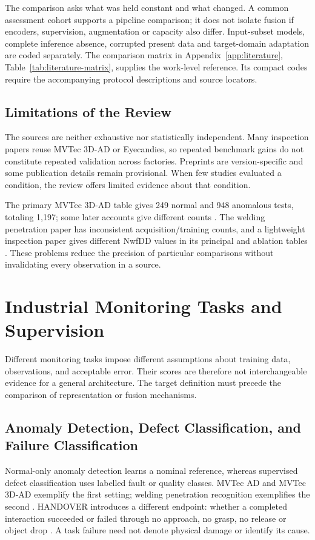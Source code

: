 The comparison asks what was held constant and what changed. A common assessment cohort supports a pipeline comparison; it does not isolate fusion if encoders, supervision, augmentation or capacity also differ. Input-subset models, complete inference absence, corrupted present data and target-domain adaptation are coded separately. The comparison matrix in Appendix~\ref{app:literature}, Table~\ref{tab:literature-matrix}, supplies the work-level reference. Its compact codes require the accompanying protocol descriptions and source locators.

\subsection{Limitations of the Review}
The sources are neither exhaustive nor statistically independent. Many inspection papers reuse MVTec 3D-AD or Eyecandies, so repeated benchmark gains do not constitute repeated validation across factories. Preprints are version-specific and some publication details remain provisional. When few studies evaluated a condition, the review offers limited evidence about that condition.

The primary MVTec 3D-AD table gives 249 normal and 948 anomalous tests, totaling 1,197; some later accounts give different counts \citep[Table~1]{Bergmann2022The}. The welding penetration paper has inconsistent acquisition/training counts, and a lightweight inspection paper gives different NwfDD values in its principal and ablation tables \citep[PDF pp.~12, 15]{Hua2026Weld}\citep[PDF p.~10, Tables~IV, VI, VII]{P035}. These problems reduce the precision of particular comparisons without invalidating every observation in a source.

\section{Industrial Monitoring Tasks and Supervision}

Different monitoring tasks impose different assumptions about training data, observations, and acceptable error. Their scores are therefore not interchangeable evidence for a general architecture. The target definition must precede the comparison of representation or fusion mechanisms.

\subsection{Anomaly Detection, Defect Classification, and Failure Classification}
Normal-only anomaly detection learns a nominal reference, whereas supervised defect classification uses labelled fault or quality classes. MVTec AD and MVTec 3D-AD exemplify the first setting; welding penetration recognition exemplifies the second \citep{Bergmann2019MVTec,Bergmann2022The,Hua2026Weld}. HANDOVER introduces a different endpoint: whether a completed interaction succeeded or failed through no approach, no grasp, no release or object drop \citep{Thoduka2024Handover}. A task failure need not denote physical damage or identify its cause.

